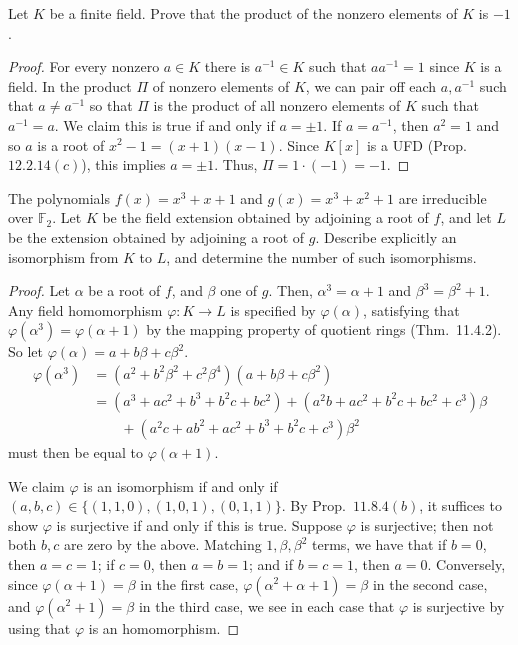 \documentclass[12pt]{article}
\theoremstyle{remark}
\begin{document}
\begin{problem}
  Let $K$ be a finite field. Prove that the product of the nonzero elements of $K$ is $-1$.
\end{problem}
\begin{proof}
  For every nonzero $a \in K$ there is $a^{-1} \in K$ such that $aa^{-1} = 1$ since $K$ is a field. In the product $\Pi$ of nonzero elements of $K$, we can pair off each $a,a^{-1}$ such that $a \ne a^{-1}$ so that $\Pi$ is the product of all nonzero elements of $K$ such that $a^{-1} = a$. We claim this is true if and only if $a=\pm1$. If $a = a^{-1}$, then $a^2 = 1$ and so $a$ is a root of $x^2-1 = (x+1)(x-1)$. Since $K[x]$ is a UFD (Prop.~$12.2.14(c)$), this implies $a = \pm1$. Thus, $\Pi = 1 \cdot (-1) = -1$.
\end{proof}

\begin{problem}
  The polynomials $f(x) = x^3 + x + 1$ and $g(x) = x^3 + x^2 + 1$ are irreducible over $\mathbb{F}_2$. Let $K$ be the field extension obtained by adjoining a root of $f$, and let $L$ be the extension obtained by adjoining a root of $g$. Describe explicitly an isomorphism from $K$ to $L$, and determine the number of such isomorphisms.
\end{problem}
\begin{proof}
  Let $\alpha$ be a root of $f$, and $\beta$ one of $g$. Then, $\alpha^3 = \alpha+1$ and $\beta^3 = \beta^2 + 1$. Any field homomorphism $\varphi\colon K \to L$ is specified by $\varphi(\alpha)$, satisfying that $\varphi(\alpha^3) = \varphi(\alpha+1)$ by the mapping property of quotient rings (Thm.~11.4.2). So let $\varphi(\alpha) = a + b\beta + c\beta^2$.
  \begin{align*}
    \varphi(\alpha^3) &= (a^2 + b^2\beta^2 + c^2\beta^4)(a + b\beta + c\beta^2)\\
    &= (a^3+ac^2+b^3+b^2c+bc^2) + (a^2b+ac^2+b^2c+bc^2+c^3)\beta\\
    &\quad\quad+ (a^2c+ab^2+ac^2+b^3+b^2c+c^3)\beta^2
  \end{align*}
  must then be equal to $\varphi(\alpha+1)$.
  \par We claim $\varphi$ is an isomorphism if and only if $(a,b,c) \in \{(1,1,0),(1,0,1),(0,1,1)\}$. By Prop.~$11.8.4(b)$, it suffices to show $\varphi$ is surjective if and only if this is true. Suppose $\varphi$ is surjective; then not both $b,c$ are zero by the above. Matching $1,\beta,\beta^2$ terms, we have that if $b=0$, then $a=c=1$; if $c=0$, then $a=b=1$; and if $b=c=1$, then $a=0$. Conversely, since $\varphi(\alpha+1) = \beta$ in the first case, $\varphi(\alpha^2+\alpha+1) = \beta$ in the second case, and $\varphi(\alpha^2+1) = \beta$ in the third case, we see in each case that $\varphi$ is surjective by using that $\varphi$ is an homomorphism.
\end{proof}
\end{document}

